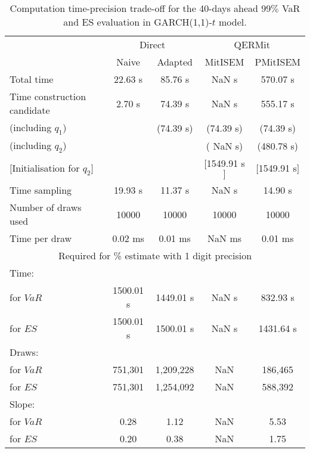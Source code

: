 { \renewcommand{\arraystretch}{1.3} 
\begin{table}[h] 
\centering 
\caption{Computation time-precision trade-off for the 40-days ahead  $99\%$ VaR and ES evaluation in GARCH(1,1)-$t$ model.} 
\label{tab:time_precision_t_garch2_noS} 
\begin{tabular}{lcccc}  
  & \multicolumn{2}{c}{Direct} & \multicolumn{2}{c}{QERMit}  \\ \cline{2-5} 
  & Naive & Adapted & MitISEM & PMitISEM  \\ \hline 
Total time & 22.63 s & 85.76 s &  NaN s & 570.07 s \\ 
Time construction candidate & 2.70 s & 74.39 s &  NaN s & 555.17 s \\ 
 (including $q_{1}$) &   &  (74.39 s) & (74.39 s) & (74.39 s) \\ 
 (including $q_{2}$) &   &  & ( NaN s) & (480.78 s) \\ 
$[$Initialisation for $q_{2}$$]$&   &   & $[$1549.91 s$]$ & $[$1549.91 s$]$ \\ 
Time sampling & 19.93 s & 11.37 s &  NaN s & 14.90 s  \\  
Number of draws used & 10000 & 10000 & 10000 & 10000 \\ 
Time per draw & 0.02 ms & 0.01 ms &  NaN ms & 0.01 ms \\ \hline 
\multicolumn{5}{c}{Required for \% estimate with 1 digit precision} \\ \hline 
Time: &  &  &   &  \\ 
\hspace{1cm} for $VaR$ & 1500.01 s & 1449.01 s &  NaN s & 832.93 s \\ 
\hspace{1cm} for $ES$ & 1500.01 s & 1500.01 s &  NaN s & 1431.64 s \\ 
Draws: &  &  &   &  \\ 
\hspace{1cm} for $VaR$ & 751,301 & 1,209,228  & NaN  & 186,465  \\ 
\hspace{1cm} for $ES$ & 751,301 & 1,254,092  & NaN   & 588,392  \\ 
\hline 
Slope: &  &  &   &  \\ 
\hspace{1cm} for $VaR$ & 0.28 & 1.12  &  NaN  & 5.53  \\ 
\hspace{1cm} for $ES$ & 0.20 & 0.38  &  NaN   & 1.75  \\  \hline 
\end{tabular} 
\end{table} 
} 
